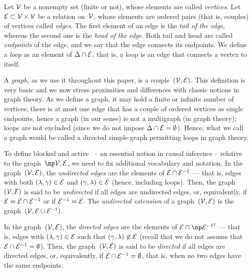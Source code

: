 \documentclass[12pt]{article}
\begin{document}
Let ${\cal V}$ be a nonempty set (finite or not), whose elements are called \emph{vertices}.  Let
\( {\cal E} \subset {\cal V}\times{\cal V} \) be a relation on~${\cal V}$, whose
elements are ordered pairs (that is, couples) of vertices called \emph{edges}.
The first element of an edge is the \emph{tail of the edge},
whereas the second one is the \emph{head of the edge}.
Both tail and head are called \emph{endpoints} of the edge,
and we say that the edge connects its endpoints.
We define a \emph{loop} %
as an element of \( \Delta \cap {\cal E} \), that is, a loop is an edge that
connects a vertex to itself.

A \emph{graph}, as we use it throughout this paper, is a
couple~$({\cal V},{\cal E})$.
This definition is very basic and we now stress proximities and differences with
classic notions in graph theory.
As we define a graph, it may hold a finite or infinite number of vertices;
there is at most one edge that has a couple of ordered vertices as single endpoints,
hence a graph (in our sense) is not a multigraph (in graph theory);
loops are not excluded (since we do not impose $\Delta \cap {\cal E}=\emptyset$).
Hence, what we call a graph would be called a directed simple graph permitting
loops in graph theory. 

To define blocked and active \undirectedEdgePaths\ -- an essential notion in causal inference --
relative to the graph~\( \npOrientedGraph \), we need to fix additional vocabulary and
notation.
In the graph~$({\cal V},{\cal E})$, 
the \emph{undirected edges} are the elements of ${\cal E} \cap {\cal E}^{-1}$
--- that is, edges with both $(\lambda,\gamma)\in {\cal E}$
and $(\gamma, \lambda)\in {\cal E}$ (hence, including loops).
Then, the graph~$({\cal V},{\cal E})$ is said to be \emph{undirected} if
all edges are undirected edges, 
or, equivalently, if \( {\cal E}={\cal E} \cap {\cal E}^{-1} \)
or if \( {\cal E}^{-1} = {\cal E} \).
The \emph{undirected extension} of a graph~$({\cal V},{\cal E})$
is the graph~$({\cal V},{\cal E} \cup {\cal E}^{-1})$.

In the graph~$({\cal V},{\cal E})$, 
the \emph{directed edges} are the elements of
$\EDGE \cap \npComplementary{ \Converse{\EDGE} }$ --- that is, 
edges with $(\lambda,\gamma)\in {\cal E}$ such that $(\gamma, \lambda)\not\in {\cal E}$
(recall that we do not assume that ${\cal E} \cap {\cal E}^{-1}=\emptyset$).
Then, the graph~$({\cal V},{\cal E})$ is said to be \emph{directed} if
all edges are directed edges, 
or, equivalently, if 
\( {\cal E} \cap {\cal E}^{-1}=\emptyset \), that is, 
when no two edges have the same endpoints.
\medskip
\end{document}
